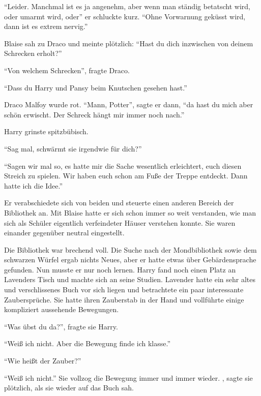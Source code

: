 \enquote{Leider. Manchmal ist es ja angenehm, aber wenn man ständig betatscht wird, oder umarmt wird, oder\abs} er schluckte kurz. \enquote{Ohne Vorwarnung geküsst wird, dann ist es extrem nervig.}

Blaise sah zu Draco und meinte plötzlich: \enquote{Hast du dich inzwischen von deinem Schrecken erholt?}

\enquote{Von welchem Schrecken}, fragte Draco.

\enquote{Dass du Harry und Pansy beim Knutschen gesehen hast.}

Draco Malfoy wurde rot. \enquote{Mann, Potter}, sagte er dann, \enquote{da hast du mich aber schön erwischt. Der Schreck hängt mir immer noch nach.}

Harry grinste spitzbübisch.

\enquote{Sag mal, schwärmt sie irgendwie für dich?}

\enquote{Sagen wir mal so, es hatte mir die Sache wesentlich erleichtert, euch diesen Streich zu spielen. Wir haben euch schon am Fuße der Treppe entdeckt. Dann hatte ich die Idee.}

Er verabschiedete sich von beiden und steuerte einen anderen Bereich der Bibliothek an. Mit Blaise hatte er sich schon immer so weit verstanden, wie man sich als Schüler eigentlich verfeindeter Häuser verstehen konnte. Sie waren einander gegenüber neutral eingestellt.

Die Bibliothek war brechend voll. Die Suche nach der Mondbibliothek sowie dem schwarzen Würfel ergab nichts Neues, aber er hatte etwas über Gebärdensprache gefunden. Nun musste er nur noch lernen. Harry fand noch einen Platz an Lavenders Tisch und machte sich an seine Studien. Lavender hatte ein sehr altes und verschlissenes Buch vor sich liegen und betrachtete ein paar interessante Zaubersprüche. Sie hatte ihren Zauberstab in der Hand und vollführte einige kompliziert aussehende Bewegungen.

\enquote{Was übst du da?}, fragte sie Harry.

\enquote{Weiß ich nicht. Aber die Bewegung finde ich klasse.}

\enquote{Wie heißt der Zauber?}

\enquote{Weiß ich nicht.} Sie vollzog die Bewegung immer und immer wieder. , sagte sie plötzlich, als sie wieder auf das Buch sah.

